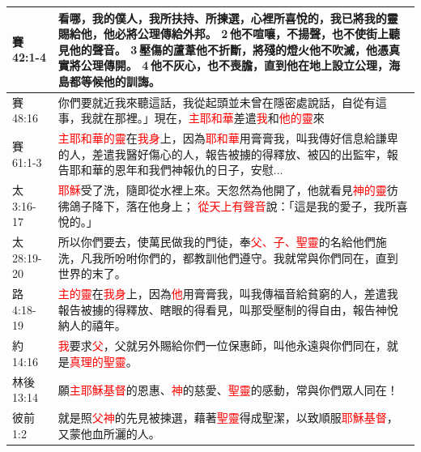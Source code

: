 \begin{table}[H]
\begin{tabular}{p{5.6em}p{43em}}
賽42:1-4&看哪，我的僕人，我所扶持、所揀選，心裡所喜悅的，我已將我的靈賜給他，他必將公理傳給外邦。 2 他不喧嚷，不揚聲，也不使街上聽見他的聲音。 3 壓傷的蘆葦他不折斷，將殘的燈火他不吹滅，他憑真實將公理傳開。 4 他不灰心，也不喪膽，直到他在地上設立公理，海島都等候他的訓誨。\\  \midrule
賽48:16&你們要就近我來聽這話，我從起頭並未曾在隱密處說話，自從有這事，我就在那裡。」現在，\textcolor{red}{主耶和華}差遣\textcolor{red}{我}和\textcolor{red}{他的靈}來\\  \midrule
賽61:1-3&\textcolor{red}{主耶和華的靈}在\textcolor{red}{我身}上，因為\textcolor{red}{耶和華}用膏膏我，叫我傳好信息給謙卑的人，差遣我醫好傷心的人，報告被擄的得釋放、被囚的出監牢，報告耶和華的恩年和我們神報仇的日子，安慰...\\  \midrule
太3:16-17&\textcolor{red}{耶穌}受了洗，隨即從水裡上來。天忽然為他開了，他就看見\textcolor{red}{神的靈}彷彿鴿子降下，落在他身上； \textcolor{red}{從天上有聲音}說：「這是我的愛子，我所喜悅的。」\\  \midrule
太28:19-20&所以你們要去，使萬民做我的門徒，奉\textcolor{red}{父、子、聖靈}的名給他們施洗，凡我所吩咐你們的，都教訓他們遵守。我就常與你們同在，直到世界的末了。\\  \midrule
路4:18-19&\textcolor{red}{主的靈}在\textcolor{red}{我身}上，因為\textcolor{red}{他}用膏膏我，叫我傳福音給貧窮的人，差遣我報告被擄的得釋放、瞎眼的得看見，叫那受壓制的得自由，報告神悅納人的禧年。\\  \midrule
約14:16&\textcolor{red}{我}要求\textcolor{red}{父}，父就另外賜給你們一位保惠師，叫他永遠與你們同在，就是\textcolor{red}{真理的聖靈}。\\  \midrule
林後13:14&願\textcolor{red}{主耶穌基督}的恩惠、\textcolor{red}{神}的慈愛、\textcolor{red}{聖靈}的感動，常與你們眾人同在！\\   \midrule
彼前1:2&就是照\textcolor{red}{父神}的先見被揀選，藉著\textcolor{red}{聖靈}得成聖潔，以致順服\textcolor{red}{耶穌基督}，又蒙他血所灑的人。\\ \bottomrule

\end{tabular}%
\end{table}


